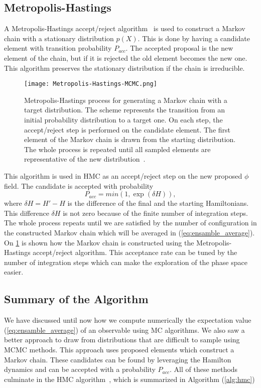 \subsection{Metropolis-Hastings}

A Metropolis-Hastings accept/reject algorithm~\cite{mhog, mhexpl} is used to construct a Markov chain with a stationary distribution $p(X)$. This is done by having a candidate element with transition probability $P_{acc}$. The accepted proposal is the new element of the chain, but if it is rejected the old element becomes the new one. This algorithm preserves the stationary distribution if the chain is irreducible.

\begin{figure}[htbp]
    \centerline{\texttt{[image: 
        Metropolis-Hastings-MCMC.png]}}
    \caption{Metropolis-Hastings process for generating a Markov chain with a target distribution. The scheme represents the transition from an initial probability distribution to a target one. On each step, the accept/reject step is performed on the candidate element. The first element of the Markov chain is drawn from the starting distribution. The whole process is repeated until all sampled elements are representative of the new distribution~\cite{pic-metro}.
    }
    \label{fig:mn-mcmc}
\end{figure}
This algorithm is used in HMC as an accept/reject step on the new proposed $\phi$ field. The candidate is accepted with probability 
\begin{equation}
    P_{acc} = min(1, \exp(\delta H)),
\end{equation}
where $\delta H = H' - H$ is the difference of the final and the starting Hamiltonians. This difference $\delta H$ is not zero because of the finite number of integration steps. The whole process repeats until we are satisfied by the number of configuration in the constructed Markov chain which will be averaged in (\cref{eq:ensamble_average}). On   \cref{fig:mn-mcmc} is shown how the Markov chain is constructed using the Metropolis-Hastings accept/reject algorithm. This acceptance rate can be tuned by the number of integration steps which can make the exploration of the phase space easier.

\subsection{Summary of the Algorithm}

We have discussed until now how we compute numerically the expectation value (\cref{eq:ensamble_average}) of an observable using MC algorithms. We also saw a better approach to draw from distributions that are difficult to sample using MCMC methods. This approach uses proposed elements which construct a Markov chain. These candidates can be found by leveraging the Hamilton dynamics and can be accepted with a probability $P_{acc}$. All of these methods culminate in the HMC algorithm~\cite{hmc}, which is summarized in Algorithm (\cref{alg:hmc})

